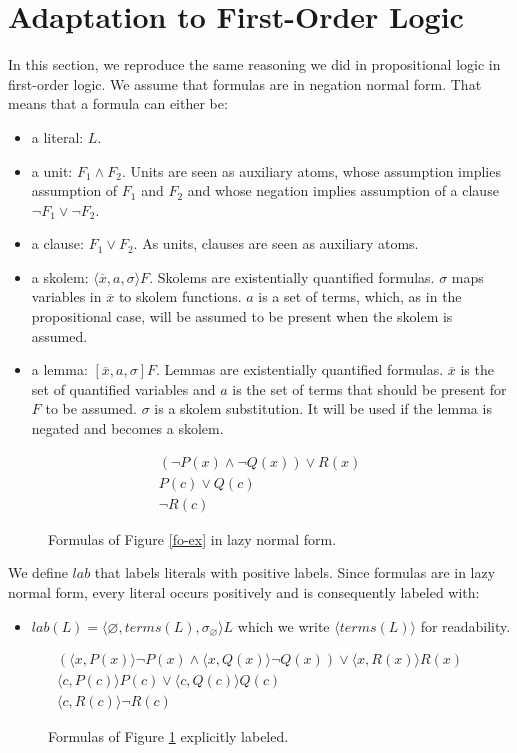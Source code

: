 \documentclass[a4paper,11pt]{article}
\newcommand{\terms}{\mathit{terms}}
\newcommand{\T}{\mathit{lab}}
\begin{document}
\section{Adaptation to First-Order Logic}
In this section, we reproduce the same reasoning we did in propositional logic in first-order logic.
We assume that formulas are in negation normal form. That means that a formula can either be:
\begin{itemize}
 \item a literal: $L$.
 \item a unit: $F_1\wedge F_2$. Units are seen as auxiliary atoms, whose assumption implies
assumption of $F_1$ and $F_2$ and whose negation implies assumption of a clause $\neg F_1\vee \neg F_2$.
 \item a clause: $F_1\vee F_2$. As units, clauses are seen as auxiliary atoms.
 \item a skolem: $\langle\overline x,a,\sigma\rangle F$. Skolems are existentially quantified formulas.
$\sigma$ maps variables in $\overline x$ to skolem functions. $a$ is a set of terms, which, as in the 
propositional case, will be assumed to be present when the skolem is assumed.
 \item a lemma: $[\overline x,a,\sigma]F$. Lemmas are existentially quantified formulas. $\overline x$
is the set of quantified variables and $a$ is the set of terms that should be present for $F$ to be
assumed. $\sigma$ is a skolem substitution. It will be used if the lemma is negated and becomes a skolem.
\end{itemize}
\begin{figure}
 \begin{eqnarray*}
 [x,P(x),x\mapsto b](\neg P(x)\wedge\neg Q(x))\vee R(x)\\
 P(c)\vee Q(c)\\
 \neg R(c)
\end{eqnarray*}
\caption{\label{fo-exn}Formulas of Figure \ref{fo-ex} in lazy normal form.}
\end{figure}
We define $\T$ that labels literals with positive labels. Since formulas are in lazy
normal form, every literal occurs positively and is consequently labeled with:
\begin{itemize}
 \item $\T(L)=\langle\varnothing,\terms(L),\sigma_\varnothing\rangle L$ which we write
$\langle\terms(L)\rangle$ for readability.
\end{itemize}
\begin{figure}
 \begin{eqnarray*}
 [x,P(x),x\mapsto b](\langle x,P(x)\rangle\neg P(x)\wedge
\langle x,Q(x)\rangle\neg Q(x))\vee
\langle x,R(x)\rangle R(x)\\
 \langle c,P(c)\rangle P(c)\vee
\langle c,Q(c)\rangle Q(c)\\
 \langle c,R(c)\rangle\neg R(c)
\end{eqnarray*}
\caption{\label{fol-ex}Formulas of Figure \ref{fo-exn} explicitly labeled.}
\end{figure}
\end{document}
